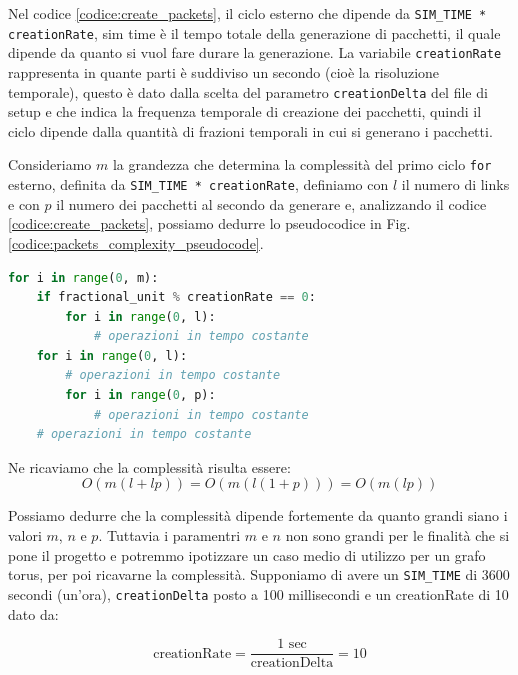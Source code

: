 \documentclass[binding=0.6cm]{sapthesis}
\begin{document}
Nel codice \ref{codice:create_packets}, il ciclo esterno che dipende da \lstinline|SIM_TIME * creationRate|, sim time è il tempo totale della generazione di pacchetti, 
il quale dipende da quanto si vuol fare durare la generazione. La variabile \lstinline|creationRate| rappresenta in quante parti è suddiviso un secondo (cioè la risoluzione temporale), questo è dato
dalla scelta del parametro \texttt{creationDelta} del file di setup e che indica la frequenza temporale di creazione dei pacchetti, quindi il ciclo dipende dalla quantità di frazioni temporali in cui si generano i pacchetti.

Consideriamo \(m\) la grandezza che determina la complessità del primo ciclo \texttt{for} esterno, definita da \lstinline|SIM_TIME * creationRate|, definiamo con \(l\)
il numero di links e con \(p\) il numero dei pacchetti al secondo da generare e, analizzando il codice \ref{codice:create_packets}, possiamo dedurre lo
pseudocodice in Fig. \ref{codice:packets_complexity_pseudocode}.

{\scriptsize
\begin{lstlisting}[language=Python, basicstyle=\ttfamily, caption={Logica creazione pacchetti, studio della complessità}, label={codice:packets_complexity_pseudocode}, breaklines=true]
for i in range(0, m):
    if fractional_unit % creationRate == 0:
        for i in range(0, l): 
            # operazioni in tempo costante
    for i in range(0, l): 
        # operazioni in tempo costante
        for i in range(0, p): 
            # operazioni in tempo costante
    # operazioni in tempo costante
\end{lstlisting}
}

Ne ricaviamo che la complessità risulta essere:
\[
    O(m(l+lp)) = O(m(l(1+p))) = O(m(lp))
\]

Possiamo dedurre che la complessità dipende fortemente da quanto grandi siano i valori \(m\), \(n\) e \(p\).
Tuttavia i paramentri \(m\) e \(n\) non sono grandi per le finalità che si pone il progetto e 
potremmo ipotizzare un caso medio di utilizzo per un grafo torus, per poi ricavarne la complessità. Supponiamo di avere un \texttt{SIM\_TIME} di 3600 secondi (un'ora), \texttt{creationDelta} posto a 100 millisecondi e un creationRate di 10 dato da: 

\begin{equation}
    \text{creationRate} = \frac{1 \text{ sec}}{\text{creationDelta}} = 10 
    \label{eq:creation_rate_example}
\end{equation}
\end{document}
